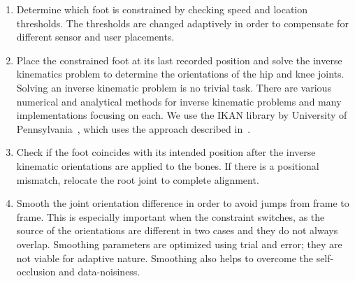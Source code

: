 \documentclass[number,preprint,review,12pt]{elsarticle}
\begin{document}
\begin{enumerate}
\item Determine which foot is constrained by checking speed and location thresholds. The thresholds are changed adaptively in order to compensate for different sensor and user placements.

\item Place the constrained foot at its last recorded position and solve the inverse kinematics problem to determine the orientations of the hip and knee joints. Solving an inverse kinematic problem is no trivial task. There are various numerical and analytical methods for inverse kinematic problems and many implementations focusing on each. We use the IKAN library by University of Pennsylvania~\cite{IKAN2013}, which uses the approach described in~\cite{Tolani2000}.  

\item Check if the foot coincides with its intended position after the inverse kinematic orientations are applied to the bones. If there is a positional mismatch, relocate the root joint to complete alignment.

\item Smooth the joint orientation difference in order to avoid jumps from frame to frame. This is especially important when the constraint switches, as the source of the orientations are different in two cases and they do not always overlap. Smoothing parameters are optimized using trial and error; they are not viable for adaptive nature. Smoothing also helps to overcome the self-occlusion and data-noisiness.
\end{enumerate}
  
\end{document}
